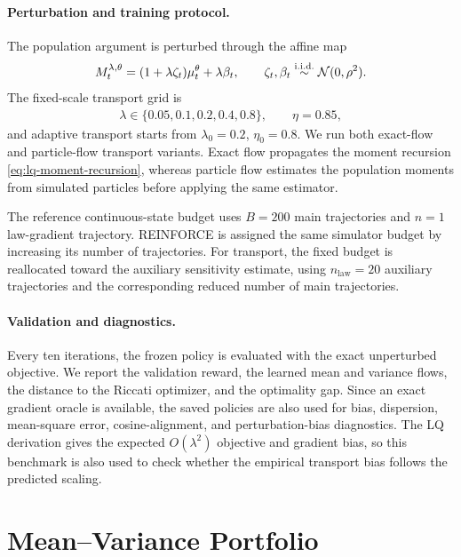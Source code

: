 \paragraph{Perturbation and training protocol.}
The population argument is perturbed through the affine map
\begin{align}
    M_t^{\lambda,\theta}
    =
    (1+\lambda\zeta_t)\mu_t^\theta+\lambda\beta_t,
    \qquad
    \zeta_t,\beta_t\overset{\mathrm{i.i.d.}}{\sim}{\cal N}(0,\rho^2).
\end{align}
The fixed-scale transport grid is
\begin{align}
    \lambda\in\{0.05,0.1,0.2,0.4,0.8\},
    \qquad
    \eta=0.85,
\end{align}
and adaptive transport starts from $\lambda_0=0.2$, $\eta_0=0.8$. We run both exact-flow and particle-flow transport variants. Exact flow propagates the moment recursion \eqref{eq:lq-moment-recursion}, whereas particle flow estimates the population moments from simulated particles before applying the same estimator.

The reference continuous-state budget uses $B=200$ main trajectories and $n=1$ law-gradient trajectory. REINFORCE is assigned the same simulator budget by increasing its number of trajectories. For transport, the fixed budget is reallocated toward the auxiliary sensitivity estimate, using $n_{\mathrm{law}}=20$ auxiliary trajectories and the corresponding reduced number of main trajectories.

\paragraph{Validation and diagnostics.}
Every ten iterations, the frozen policy is evaluated with the exact unperturbed objective. We report the validation reward, the learned mean and variance flows, the distance to the Riccati optimizer, and the optimality gap. Since an exact gradient oracle is available, the saved policies are also used for bias, dispersion, mean-square error, cosine-alignment, and perturbation-bias diagnostics. The LQ derivation gives the expected $O(\lambda^2)$ objective and gradient bias, so this benchmark is also used to check whether the empirical transport bias follows the predicted scaling.

\section{Mean--Variance Portfolio}
\label{appendix:spec-portfolio}

